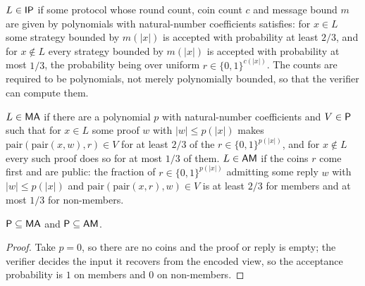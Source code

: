 \begin{definition}[IP]
  \label{def:IP}
  \leanok
  $L \in \mathsf{IP}$ if some protocol whose round count, coin count $c$ and
  message bound $m$ are given by polynomials with natural-number coefficients
  satisfies: for $x \in L$ some strategy bounded by $m(|x|)$ is accepted with
  probability at least $2/3$, and for $x \notin L$ every strategy bounded by
  $m(|x|)$ is accepted with probability at most $1/3$, the probability being
  over uniform $r \in \{0,1\}^{c(|x|)}$. The counts are required to be
  polynomials, not merely polynomially bounded, so that the verifier can
  compute them.
\end{definition}

\begin{definition}[MA and AM]
  \label{def:MA-AM}
  \leanok
  $L \in \mathsf{MA}$ if there are a polynomial $p$ with natural-number
  coefficients and $V \in \mathsf{P}$ such that
  for $x \in L$ some proof $w$ with $|w| \le p(|x|)$ makes
  $\mathrm{pair}(\mathrm{pair}(x, w), r) \in V$ for at least $2/3$ of the
  $r \in \{0,1\}^{p(|x|)}$, and for $x \notin L$ every such proof does so for at
  most $1/3$ of them. $L \in \mathsf{AM}$ if the coins $r$ come first and are
  public: the fraction of $r \in \{0,1\}^{p(|x|)}$ admitting some reply $w$
  with $|w| \le p(|x|)$
  and $\mathrm{pair}(\mathrm{pair}(x, r), w) \in V$ is at least $2/3$ for
  members and at most $1/3$ for non-members.
\end{definition}

\begin{proposition}
  \label{prop:interaction-P-subset-MA-AM}
  \leanok
  $\mathsf{P} \subseteq \mathsf{MA}$ and $\mathsf{P} \subseteq \mathsf{AM}$.
\end{proposition}
\begin{proof}
  \leanok
  Take $p = 0$, so there are no coins and the proof or reply is empty; the
  verifier decides the input it recovers from the encoded view, so the
  acceptance probability is $1$ on members and $0$ on non-members.
\end{proof}

